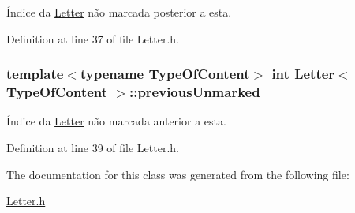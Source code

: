 Índice da \hyperlink{classLetter}{Letter} não marcada posterior a esta. 



Definition at line 37 of file Letter.\+h.

\hypertarget{classLetter_a8b0435db39f7a35dd3874f981d7f19e6}{
\subsubsection[{previous\+Unmarked}]{\setlength{\rightskip}{0pt plus 5cm}template$<$typename Type\+Of\+Content$>$ int {\bf Letter}$<$ Type\+Of\+Content $>$\+::previous\+Unmarked}}\label{classLetter_a8b0435db39f7a35dd3874f981d7f19e6}


Índice da \hyperlink{classLetter}{Letter} não marcada anterior a esta. 



Definition at line 39 of file Letter.\+h.



The documentation for this class was generated from the following file\+:\begin{DoxyCompactItemize}
\item 
\hyperlink{Letter_8h}{Letter.\+h}\end{DoxyCompactItemize}
